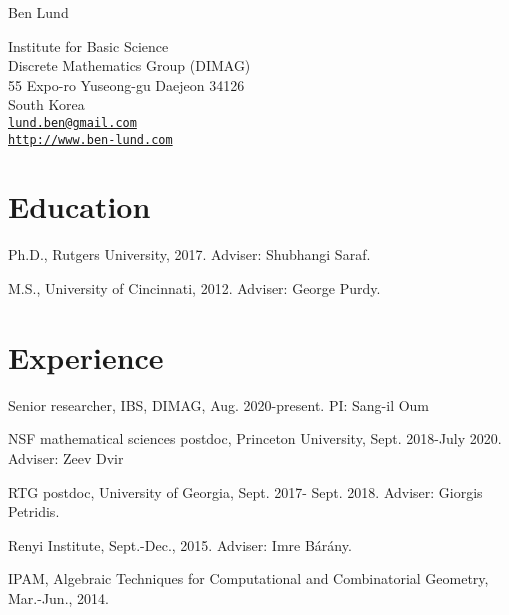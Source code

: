 \documentclass[letterpaper]{article}
\def\name{Ben Lund}
\renewenvironment{itemize}{
  \begin{list}{}{
    \setlength{\leftmargin}{1.5em}
  }
}{
  \end{list}
}
\begin{document}
	
	

{\huge \name}


\vspace{0.25in}


\begin{minipage}{0.45\linewidth}

  Institute for Basic Science\\
  Discrete Mathematics Group (DIMAG) \\
  55 Expo-ro Yuseong-gu Daejeon 34126 \\
  South Korea \\
   \href{mailto:lund.ben@gmail.com}{\tt lund.ben@gmail.com} \\
   \href{www.ben-lund.com}{\tt http://www.ben-lund.com} \\
\end{minipage}


\section*{Education}

\begin{itemize}
  \item Ph.D., Rutgers University, 2017. Adviser: Shubhangi Saraf.
  \item M.S., University of Cincinnati, 2012. Adviser: George Purdy.
\end{itemize}


\section*{Experience}

\begin{itemize}
\item Senior researcher, IBS, DIMAG, Aug. 2020-present. PI: Sang-il Oum
\item NSF mathematical sciences postdoc, Princeton University, Sept. 2018-July 2020. Adviser: Zeev Dvir
\item RTG postdoc, University of Georgia, Sept. 2017- Sept. 2018. Adviser: Giorgis Petridis.
\item Renyi Institute, Sept.-Dec., 2015. Adviser: Imre B\'ar\'any.
\item IPAM, Algebraic Techniques for Computational and Combinatorial Geometry, Mar.-Jun., 2014.
\end{itemize}
\end{document}

